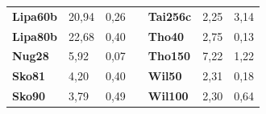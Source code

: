 \documentclass[a4paper, 12pt]{article}
\begin{document}
\begin{table}[H]
\begin{tabular}{|l|l|l|l|l|l|l|}
\textbf{Lipa60b}                    & 20,94                              & 0,26                                 &                                & \textbf{Tai256c}                   & 2,25                               & 3,14                                 \\ \cline{1-3} \cline{5-7} 
\textbf{Lipa80b}                    & 22,68                              & 0,40                                 &                                & \textbf{Tho40}                     & 2,75                               & 0,13                                 \\ \cline{1-3} \cline{5-7} 
\textbf{Nug28}                      & 5,92                               & 0,07                                 &                                & \textbf{Tho150}                    & 7,22                               & 1,22                                 \\ \cline{1-3} \cline{5-7} 
\textbf{Sko81}                      & 4,20                               & 0,40                                 &                                & \textbf{Wil50}                     & 2,31                               & 0,18                                 \\ \cline{1-3} \cline{5-7} 
\textbf{Sko90}                      & 3,79                               & 0,49                                 &                                & \textbf{Wil100}                    & 2,30                               & 0,64                                 \\ \cline{1-3} \cline{5-7} 
\end{tabular}
\end{table}

		
	  \newpage
\end{document}
